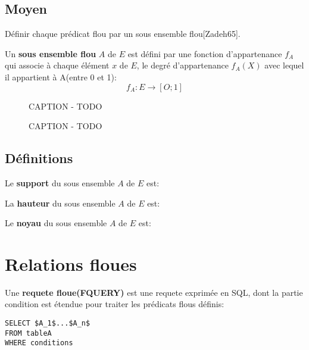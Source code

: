 \documentclass[a4paper,11pt]{article}
\begin{document}
\subsection{Moyen}
Définir chaque prédicat flou par un sous ensemble flou[Zadeh65].

Un \textbf{sous ensemble flou} $A$ de $E$ est défini par une fonction d'appartenance $f_A$ qui associe à chaque élément $x$ de $E$, le degré d'appartenance $f_A(X)$ avec lequel il appartient à A(entre 0 et 1):$$f_A:E\rightarrow[O;1]$$

		\begin{figure}[!h]
			\centering
			
			\caption{CAPTION - TODO}
		\end{figure}
		
		\begin{figure}[!h]
			\centering
			
			\caption{CAPTION - TODO}
		\end{figure}
		
\subsection{Définitions}

Le \textbf{support} du sous ensemble $A$ de $E$ est: \begin{center}  \end{center}

La \textbf{hauteur} du sous ensemble $A$ de $E$ est: \begin{center}  \end{center}

Le \textbf{noyau} du sous ensemble $A$ de $E$ est: \begin{center}  \end{center}

\section{Relations floues}
Une \textbf{requete floue(FQUERY)} est une requete exprimée en SQL, dont la partie condition est étendue pour traiter les prédicats flous définis:\\

\begin{lstlisting}[mathescape]
SELECT $A_1$...$A_n$
FROM tableA
WHERE conditions
\end{lstlisting}
~
\end{document}
